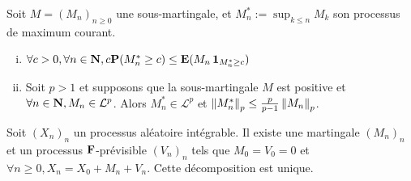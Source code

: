 	\begin{thm}
		Soit $M = (M_n)_{n \geq 0}$ une sous-martingale, et $M_n^* := \sup_{k \leq n} M_k$ son processus de maximum courant.
		\begin{enumerate}[(i)]
			\item $\forall c > 0, \forall n \in \mathbf{N}, c \mathbf{P}(M_n^* \geq c) \leq \mathbf{E}(M_n \operatorname{\mathbf{1}}_{M_n^* \geq c})$
			\item Soit $p > 1$ et supposons que la sous-martingale $M$ est positive et $\forall n \in \mathbf{N}, M_n \in \mathcal{L}^p$.
				Alors $M_n^* \in \mathcal{L}^p$ et $\left\lVert M_n^*\right\rVert_p \leq \frac{p}{p - 1} \left\lVert M_n\right\rVert_p$.
		\end{enumerate}
	\end{thm}

	\begin{pop}
		Soit $(X_n)_n$ un processus aléatoire intégrable.
		Il existe une martingale $(M_n)_n$ et un processus $\mathbf{F}$-prévisible $(V_n)_n$ tels que $M_0 = V_0 = 0$ et $\forall n \geq 0, X_n = X_0 + M_n + V_n$.
		Cette décomposition est unique.
	\end{pop}
